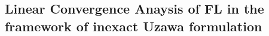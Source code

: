 %
%
%

\subsection{Linear Convergence Anaysis of FL in the framework of inexact Uzawa formulation}\label{flalgorithm} 

